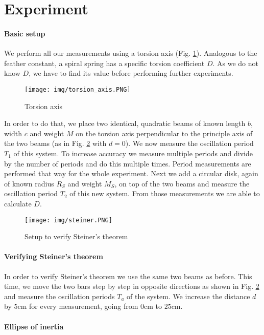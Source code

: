 \section{Experiment}

\paragraph{Basic setup}
We perform all our measurements using a torsion axis (Fig. \ref{fig::torsion}).
Analogous to the feather constant, a spiral spring has a specific torsion coefficient $D$.
As we do not know $D$, we have to find its value before performing further experiments.

\begin{figure} [ht]
	\centering
	\texttt{[image: img/torsion\_axis.PNG]}
	\caption{Torsion axis \cite{manual}}
	\label{fig::torsion}
\end{figure}

In order to do that, we place two identical, quadratic beams of known length $b$, width $c$ and weight $M$ on the torsion axis perpendicular to the principle axis of the two beams (as in Fig. \ref{fig::steiner} with $d = 0$).
We now measure the oscillation period $T_1$ of this system.
To increase accuracy we measure multiple periods and divide by the number of periods and do this multiple times.
Period measurements are performed that way for the whole experiment.
Next we add a circular disk, again of known radius $R_S$ and weight $M_S$, on top of the two beams and measure the oscillation period $T_2$ of this new system.
From those measurements we are able to calculate $D$.

\begin{figure} [ht]
	\centering
	\texttt{[image: img/steiner.PNG]}
	\caption{Setup to verify Steiner's theorem \cite{manual}}
	\label{fig::steiner}
\end{figure}

\paragraph{Verifying Steiner's theorem}
In order to verify Steiner's theorem we use the same two beams as before.
This time, we move the two bars step by step in opposite directions as shown in Fig. \ref{fig::steiner} and measure the oscillation periods $T_a$ of the system.
We increase the distance $d$ by $5$cm for every measurement, going from $0$cm to $25$cm.

\paragraph{Ellipse of inertia}

